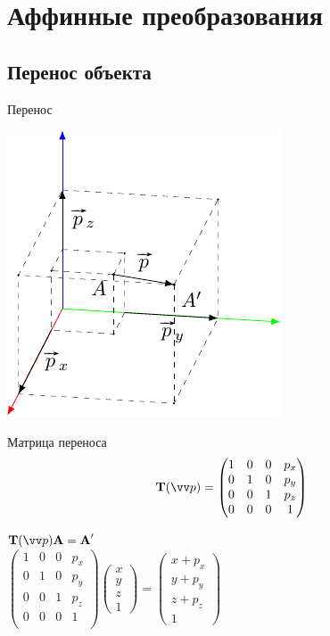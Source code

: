 \documentclass[10pt]{beamer}
\begin{document}
    
    \section{Аффинные преобразования}
    
    \frame{\sectionpage}
    
    \subsection{Перенос объекта}

	\begin{frame}{Перенос}
		
		{
			\includegraphics{trans.pdf}
		}
		{
			\begin{block}{Матрица переноса}
				$$
				\textbf{T}(\vv p) =
				\begin{pmatrix}
					1 & 0 & 0 & p_x\\
					0 & 1 & 0 & p_y\\
					0 & 0 & 1 & p_z\\
					0 & 0 & 0 & 1\\
				\end{pmatrix}
				$$
			\end{block}
			$\textbf{T}(\vv p)\textbf{A}=\textbf{A}'$ \\[0.5em]
			$
			\begin{pmatrix}
				1 & 0 & 0 & p_x\\
				0 & 1 & 0 & p_y\\
				0 & 0 & 1 & p_z\\
				0 & 0 & 0 & 1\\
			\end{pmatrix}
			\begin{pmatrix}
				x\\
				y\\
				z\\
				1
			\end{pmatrix}
			=
			\begin{pmatrix}
				x+p_x\\
				y+p_y\\
				z+p_z\\
				1
			\end{pmatrix}			
			$
		}
		
	\end{frame}
	
\end{document}
